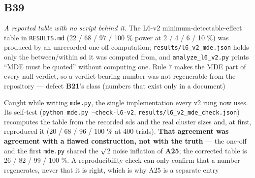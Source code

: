 \documentclass[10pt]{article}
\begin{document}
\subsection*{B39}\label{led:B39}
\begin{description}[leftmargin=0pt,itemsep=1pt]
\item[Defect.] \emph{A reported table with no script behind it.} The L6-v2 minimum-detectable-effect table in \texttt{RESULTS.md} (22 / 68 / 97 / 100 \% power at 2 / 4 / 6 / 10 \%) was produced by an unrecorded one-off computation; \texttt{results/l6\_v2\_mde.json} holds only the between/within sd it was computed from, and \texttt{analyze\_l6\_v2.py} prints ``MDE must be quoted'' without computing one. Rule 7 makes the MDE part of every null verdict, so a verdict-bearing number was not regenerable from the repository --- defect \textbf{B21}'s class (numbers that exist only in a document)
\item[How it was caught.] Caught while writing \texttt{mde.py}, the single implementation every v2 rung now uses. Its self-test (\texttt{python mde.py --check-l6-v2}, \texttt{results/l6\_v2\_mde\_check.json}) recomputes the table from the recorded sds and the real cluster sizes and, at first, reproduced it (20 / 68 / 96 / 100 \% at 400 trials). \textbf{That agreement was agreement with a flawed construction, not with the truth} --- the one-off and the first \texttt{mde.py} shared the $\surd$2 noise inflation of \textbf{A25}; the corrected table is 26 / 82 / 99 / 100 \%. A reproducibility check can only confirm that a number regenerates, never that it is right, which is why A25 is a separate entry
\end{description}
\end{document}
